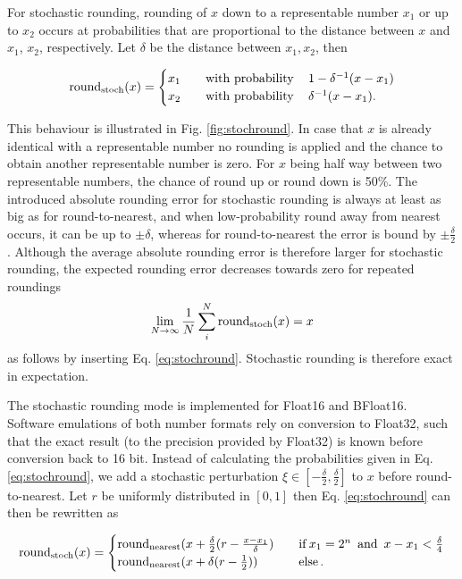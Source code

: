 For stochastic rounding, rounding of $x$ down to a representable number $x_1$ or up to $x_2$ occurs at probabilities that are proportional
to the distance between $x$ and $x_1$, $x_2$, respectively. Let $\delta$ be the distance between $x_1,x_2$, then

\begin{equation}
\operatorname{round}_{\operatorname{stoch}}(x) =
\begin{cases}
x_1 \quad &\operatorname{with~probability}\quad 1 - \delta^{-1}(x - x_1)  \\
x_2 &\operatorname{with~probability}\quad  \delta^{-1}(x - x_1).
\end{cases}
\label{eq:stochround}
\end{equation}

This behaviour is illustrated in Fig. \ref{fig:stochround}. In case that $x$ is already identical with a representable number no rounding is applied
and the chance to obtain another representable number is zero. For $x$ being half way between two representable numbers, the chance of
round up or round down is 50\%. The introduced absolute rounding error for stochastic rounding is always at least as big as for round-to-nearest,
and when low-probability round away from nearest occurs, it can be up to $\pm \delta$, whereas for round-to-nearest the error is bound by
$\pm \tfrac{\delta}{2}$. Although the average absolute rounding error is therefore larger for stochastic rounding, the expected rounding error
decreases towards zero for repeated roundings
\begin{equation}
\lim_{N\to \infty}\frac{1}{N} \sum_i^N \operatorname{round}_{\operatorname{stoch}}(x) = x
\end{equation}
as follows by inserting Eq. \ref{eq:stochround}. Stochastic rounding is therefore exact in expectation.

The stochastic rounding mode is implemented for Float16 and BFloat16. Software emulations of both number formats rely on conversion to Float32,
such that the exact result (to the precision provided by Float32) is known before conversion back to 16 bit. Instead of calculating the probabilities
given in Eq. \ref{eq:stochround}, we add a stochastic perturbation $\xi \in [-\tfrac{\delta}{2},\tfrac{\delta}{2}]$ to $x$ before round-to-nearest.
Let $r$ be uniformly distributed in $[0,1]$ then Eq. \ref{eq:stochround} can then be rewritten as

\begin{equation}
\operatorname{round}_{\operatorname{stoch}}(x) =
\begin{cases}
\operatorname{round}_{\operatorname{nearest}}(x +\tfrac{\delta}{2}(r - \tfrac{x-x_1}{\delta}) \quad & \operatorname{if} x_1 = 2^n \operatorname{~and~} x-x_1 < \tfrac{\delta}{4}  \\
\operatorname{round}_{\operatorname{nearest}}(x + \delta(r-\tfrac{1}{2})) & \operatorname{else}.
\end{cases}
\end{equation}

